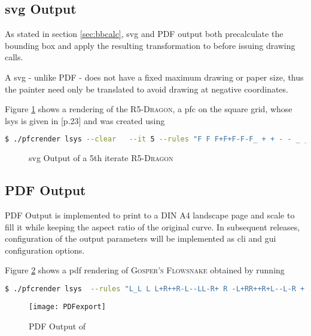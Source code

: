 \subsection{\gls{svg} Output}
\label{sec:svg}
As stated in section \ref{sec:bbcalc}, \gls{svg} and PDF output both precalculate the bounding box and apply the resulting transformation to  before issuing drawing calls.

A \gls{svg} - unlike PDF - does not have a fixed maximum drawing or paper size, thus the painter need only be translated to avoid drawing at negative coordinates.

Figure \ref{fig:plugsvg} shows a rendering of the \textsc{R5-Dragon}, a \gls{pfc} on the square grid, whose \gls{lsys} is given in \citet{Arndt2016}[p.23] and was created using 
\begin{lstlisting}[language=bash]
$ ./pfcrender lsys --clear   --it 5 --rules "F F F+F+F-F-F_ + + - - _ _ ~ ~" --sw 2 --sl 10 --rd 0.33 --batch svg --a 90
\end{lstlisting}

\begin{figure}
	
	\caption{\gls{svg} Output of a 5th iterate \textsc{R5-Dragon}}
	\label{fig:plugsvg}
\end{figure}
\subsection{PDF Output}
\label{sec:pdf}
PDF Output is implemented to print to a DIN A4 landscape page and scale to fill it while keeping the aspect ratio of the original curve.
In subsequent releases, configuration of the output parameters will be implemented as \gls{cli} and \gls{gui} configuration options.

Figure \ref{fig:plugpdf} shows a pdf rendering of \textsc{Gosper's Flowsnake} obtained by running
\begin{lstlisting}[language=bash]
$ ./pfcrender lsys  --rules "L_L L L+R++R-L--LL-R+ R -L+RR++R+L--L-R + + - - _ _ ~ ~" --sw 2 --sl 10  --it 4 --rd 0.5 --ia -60 --a 60 pdf --batch
\end{lstlisting}

\begin{figure}
	\texttt{[image: PDFexport]}
	\caption{PDF Output of }
	\label{fig:plugpdf}
\end{figure}

